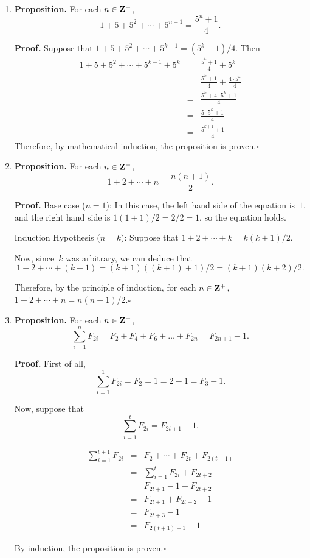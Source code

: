 \documentclass[12pt,letterpaper]{report}
\def\ds{\displaystyle}
\def\Z{{\bf Z}}
\begin{document}
\begin{enumerate}

\item  {\bf Proposition.}  For each $n\in\Z^+$, 
$$1 + 5 + 5^2 +\cdots + 5^{n - 1} = \frac{5^n + 1}{4}.$$

{\bf Proof.}  Suppose that $1 + 5 + 5^2 +\cdots + 5^{k - 1} = (5^k + 1)/4$.
Then
\begin{equation}
\begin{array}{rcl}
1 + 5 + 5^2 +\cdots + 5^{k - 1} + 5^k & = & \ds \frac{5^k + 1}{4} + 5^k\\[12pt]
& = & \ds \frac{5^k + 1}{4} + \frac{4\cdot 5^k}4\\[12pt]
& = & \ds \frac{5^k + 4\cdot 5^k + 1}4\\[12pt]
& = & \ds \frac{5\cdot 5^k + 1}4\\[12pt]
& = & \ds \frac{5^{k + 1} + 1}4
\end{array}
\end{equation}
Therefore, by mathematical induction, the proposition is proven.\hfill$\square$

\newpage

\item  {\bf Proposition.}  For each $n\in\Z^+$, 
$$1 + 2 + \cdots + n = \frac{n(n + 1)}2.$$

{\bf Proof.}  Base case ($n = 1$):  In this case, the left hand side of the equation is~$1$,
and the right hand side is $1(1 + 1)/2 = 2/2 = 1$, so the equation holds.

\smallskip

Induction Hypothesis ($n = k$):  Suppose that 
$1 + 2 + \cdots + k = k(k + 1)/2$.

Now, since~$k$ was arbitrary, we can deduce that
$$1 + 2 + \cdots + (k + 1) = (k + 1)((k + 1) + 1)/2 = (k + 1)(k + 2)/2.$$

\smallskip

Therefore, by the principle of induction, for each $n\in\Z^+$, 
$1 + 2 + \cdots + n = n(n + 1)/2$.\hfill$\square$

\bigskip

\item  {\bf Proposition.}  For each $n\in\Z^+$,
$$\sum_{i = 1}^n F_{2i} = F_2 + F_4 + F_6 + \ldots + F_{2n} = F_{2n+1} - 1.$$

{\bf Proof.}  First of all,
$$\sum_{i = 1}^1 F_{2i} = F_2 = 1 = 2-1 = F_{3} - 1.$$

Now, suppose that $$\sum_{i = 1}^t F_{2i} = F_{2t+1} - 1.$$

\begin{equation}
\begin{array}{rcl}
\ds\sum_{i = 1}^{t+1} F_{2i}
& = & F_2 + \cdots + F_{2t} + F_{2(t+1)}\\
& = & \ds\sum_{i = 1}^t F_{2i} + F_{2t + 2}\\[12pt]
& = & F_{2t + 1} - 1 + F_{2t+2}\\[6pt]
& = & F_{2t + 1} + F_{2t+2} - 1 \\[6pt]
& = & F_{2t + 3}  - 1 \\[6pt]
& = & F_{2(t + 1) + 1} -1
\end{array}
\end{equation}


By induction, the proposition is proven.\hfill$\square$

\end{enumerate}
\end{document}
